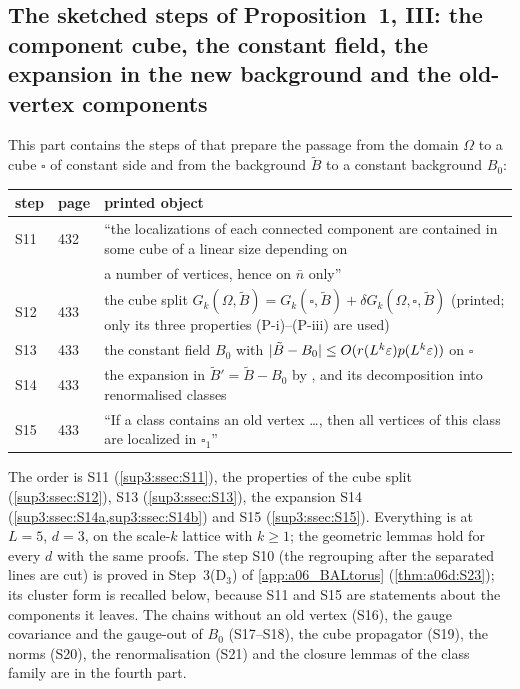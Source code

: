 
\subsection{The sketched steps of Proposition~1, III: the component cube, the constant field, the expansion in the new background and the old-vertex components}\label{sup3:sec}

This part contains the steps of \cite[pp.~432--433]{Ba3} that prepare the passage from the domain $\Omega$ to a cube $\square$ of constant side and from the background $\tilde B$ to a constant background $B_0$:

\begin{center}
\begin{tabular}{lll}
step & \cite{Ba3} page & printed object\\\hline
S11 & 432 & ``the localizations of each connected component are contained in some cube of a linear size depending on\\
 & & a number of vertices, hence on $\bar n$ only''\\
S12 & 433 & the cube split $G_k(\Omega,\tilde B)=G_k(\square,\tilde B)+\delta G_k(\Omega,\square,\tilde B)$ (printed; only its three properties (P-i)--(P-iii) are used)\\
S13 & 433 & the constant field $B_0$ with $|\tilde B-B_0|\le O(r(L^k\varepsilon)p(L^k\varepsilon))$ on $\square$\\
S14 & 433 & the expansion in $\tilde B'=\tilde B-B_0$ by \cite[(3.14), (3.44), (3.45)]{Ba1}, and its decomposition into renormalised classes\\
S15 & 433 & ``If a class contains an old vertex \dots, then all vertices of this class are localized in $\square_1$''
\end{tabular}
\end{center}

The order is S11 (\cref{sup3:ssec:S11}), the properties of the cube split (\cref{sup3:ssec:S12}), S13 (\cref{sup3:ssec:S13}), the expansion S14 (\cref{sup3:ssec:S14a,sup3:ssec:S14b}) and S15 (\cref{sup3:ssec:S15}). Everything is at $L=5$, $d=3$, on the scale-$k$ lattice with $k\ge1$; the geometric lemmas hold for every $d$ with the same proofs. The step S10 (the regrouping after the separated lines are cut) is proved in Step~3(D$_3$) of \cref{app:a06_BALtorus} (\cref{thm:a06d:S23}); its cluster form is recalled below, because S11 and S15 are statements about the components it leaves. The chains without an old vertex (S16), the gauge covariance and the gauge-out of $B_0$ (S17--S18), the cube propagator (S19), the norms (S20), the renormalisation (S21) and the closure lemmas of the class family are in the fourth part.

